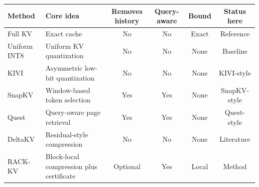 \begin{threeparttable}
\begin{tabularx}{\linewidth}{@{}lXcccc@{}}
\toprule
Method & Core idea & Removes history & Query-aware & Bound & Status here \\
\midrule
Full KV & Exact cache & No & No & Exact & Reference \\
Uniform INT8 & Uniform KV quantization & No & No & None & Baseline \\
KIVI & Asymmetric low-bit quantization & No & No & None & KIVI-style \\
SnapKV & Window-based token selection & Yes & Yes & None & SnapKV-style \\
Quest & Query-aware page retrieval & Yes & Yes & None & Quest-style \\
DeltaKV & Residual-style compression & No & No & None & Literature \\
RACK-KV & Block-local compression plus certificate & Optional & Yes & Local & Method \\
\bottomrule
\end{tabularx}
\end{threeparttable}
